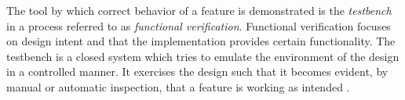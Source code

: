 The tool by which correct behavior of a feature is demonstrated is the \textit{testbench} in a process referred to as
\textit{functional verification}. Functional verification focuses on design intent and that the implementation
provides certain functionality. The testbench is a closed system which tries to emulate the environment of the design
in a controlled manner. It exercises the design such that it becomes evident, by manual or automatic inspection, that
a feature is working as intended \cite[Ch. 1]{bergeron2012writing}.

